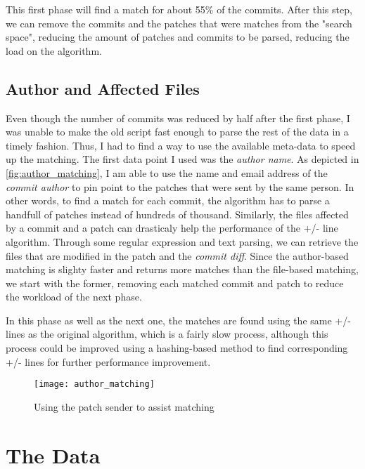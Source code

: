 This first phase will find a match for about 55\% of the commits. After this step, we can remove the commits and the patches that were matches from the "search space", reducing the amount of patches and commits to be parsed, reducing the load on the algorithm. 

\subsection{Author and Affected Files}

Even though the number of commits was reduced by half after the first phase, I was unable to make the old script fast enough to parse the rest of the data in a timely fashion. Thus, I had to find a way to use the available meta-data to speed up the matching. The first data point I used was the \textit{author name}. As depicted in \autoref{fig:author_matching}, I am able to use the name and email address of the \textit{commit author} to pin point to the patches that were sent by the same person. In other words, to find a match for each commit, the algorithm has to parse a handfull of patches instead of hundreds of thousand. Similarly, the files affected by a commit and a patch can drasticaly help the performance of the +/- line algorithm. Through some regular expression and text parsing, we can retrieve the files that are modified in the patch and the \textit{commit diff}. Since the author-based matching is slighty faster and returns more matches than the file-based matching, we start with the former, removing each matched commit and patch to reduce the workload of the next phase.

In this phase as well as the next one, the matches are found using the same +/- lines as the original algorithm, which is a fairly slow process, although this process could be improved using a hashing-based method to find corresponding +/- lines for further performance improvement. 



\begin{figure}[htb]
\centering
\texttt{[image: author\_matching]}
\caption{Using the patch sender to assist matching}
\label{fig:author_matching}
\end{figure}


\section{The Data}

